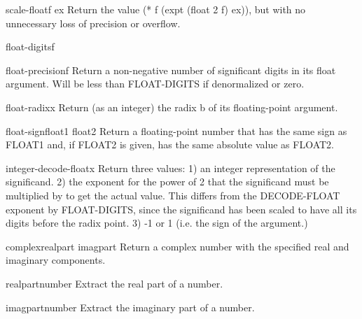 \begin{function}{scale-float}{f ex}{}{}
  Return the value (* f (expt (float 2 f) ex)), but with no unnecessary loss
  of precision or overflow.
\end{function}

\begin{function}{float-digits}{f}{}{}
  
\end{function}

\begin{function}{float-precision}{f}{}{}
  Return a non-negative number of significant digits in its float argument.
  Will be less than FLOAT-DIGITS if denormalized or zero.
\end{function}

\begin{function}{float-radix}{x}{}{}
  Return (as an integer) the radix b of its floating-point argument.
\end{function}

\begin{function}{float-sign}{float1 \op float2}{}{}
  Return a floating-point number that has the same sign as
   FLOAT1 and, if FLOAT2 is given, has the same absolute value
   as FLOAT2.
\end{function}

\begin{function}{integer-decode-float}{x}{}{}
  Return three values:
   1) an integer representation of the significand.
   2) the exponent for the power of 2 that the significand must be multiplied
      by to get the actual value. This differs from the DECODE-FLOAT exponent
      by FLOAT-DIGITS, since the significand has been scaled to have all its
      digits before the radix point.
   3) -1 or 1 (i.e. the sign of the argument.)
\end{function}

\begin{function}{complex}{realpart \op imagpart}{}{}
  Return a complex number with the specified real and imaginary components.
\end{function}

\begin{function}{realpart}{number}{}{}
  Extract the real part of a number.
\end{function}

\begin{function}{imagpart}{number}{}{}
  Extract the imaginary part of a number.
\end{function}

